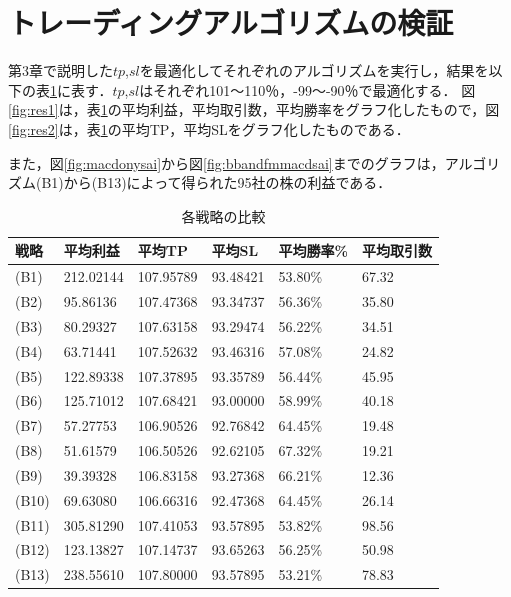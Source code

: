 \section{トレーディングアルゴリズムの検証}
第3章で説明した$tp$,$sl$を最適化してそれぞれのアルゴリズムを実行し，結果を以下の表\ref{strategy_comparison}に表す．$tp$,$sl$はそれぞれ101～110％，-99～-90％で最適化する．
図\ref{fig:res1}は，表\ref{strategy_comparison}の平均利益，平均取引数，平均勝率をグラフ化したもので，図\ref{fig:res2}は，表\ref{strategy_comparison}の平均TP，平均SLをグラフ化したものである．

また，図\ref{fig:macdonysai}から図\ref{fig:bbandfmmacdsai}までのグラフは，アルゴリズム(B1)から(B13)によって得られた95社の株の利益である．
\begin{table}[htbp]
  \small
  \centering
  \caption{各戦略の比較}
  \label{strategy_comparison}
  \begin{tabular}{|l||l|l|l|l|l|}
    \hline
    
  \textbf{戦略} & \textbf{平均利益} & \textbf{平均TP} & \textbf{平均SL} & \textbf{平均勝率\%} & \textbf{平均取引数} \\
  \hline

  (B1) & 212.02144 & 107.95789 & 93.48421 & 53.80\% & 67.32 \\\hline
  (B2) & 95.86136 & 107.47368 & 93.34737 & 56.36\% & 35.80 \\\hline
  (B3) & 80.29327 & 107.63158 & 93.29474 & 56.22\% & 34.51 \\\hline
  (B4) & 63.71441 & 107.52632 & 93.46316 & 57.08\% & 24.82 \\\hline
  (B5) & 122.89338 & 107.37895 & 93.35789 & 56.44\% & 45.95 \\\hline
  (B6) & 125.71012 & 107.68421 & 93.00000 & 58.99\% & 40.18 \\\hline
  (B7) & 57.27753 & 106.90526 & 92.76842 & 64.45\% & 19.48 \\\hline
  (B8) & 51.61579 & 106.50526 & 92.62105 & 67.32\% & 19.21 \\\hline
  (B9) & 39.39328 & 106.83158 & 93.27368 & 66.21\% & 12.36 \\\hline
  (B10) & 69.63080 & 106.66316 & 92.47368 & 64.45\% & 26.14 \\\hline
  (B11) & 305.81290 & 107.41053 & 93.57895 & 53.82\% & 98.56 \\\hline
  (B12) & 123.13827 & 107.14737 & 93.65263 & 56.25\% & 50.98 \\\hline
  (B13) & 238.55610 & 107.80000 & 93.57895 & 53.21\% & 78.83 \\\hline
 
  \end{tabular}
\end{table}

